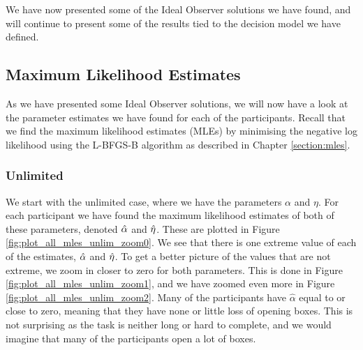 We have now presented some of the Ideal Observer solutions we have found, and will continue to present some of the results tied to the decision model we have defined. 





\subsection{Maximum Likelihood Estimates}
\label{chapter:mles}
As we have presented some Ideal Observer solutions, we will now have a look at the parameter estimates we have found for each of the participants. Recall that we find the maximum likelihood estimates (MLEs) by minimising the negative log likelihood using the L-BFGS-B algorithm as described in Chapter \ref{section:mles}.


\subsubsection{Unlimited}
We start with the unlimited case, where we have the parameters $\alpha$ and $\eta$. For each participant we have found the maximum likelihood estimates of both of these parameters, denoted $\hat{\alpha}$ and $\hat{\eta}$. These are plotted in Figure \ref{fig:plot_all_mles_unlim_zoom0}. We see that there is one extreme value of each of the estimates, $\hat{\alpha}$ and $\hat{\eta}$. To get a better picture of the values that are not extreme, we zoom in closer to zero for both parameters. This is done in Figure \ref{fig:plot_all_mles_unlim_zoom1}, and we have zoomed even more in Figure \ref{fig:plot_all_mles_unlim_zoom2}. Many of the participants have $\hat{\alpha}$ equal to or close to zero, meaning that they have none or little loss of opening boxes. This is not surprising as the task is neither long or hard to complete, and we would imagine that many of the participants open a lot of boxes. 

